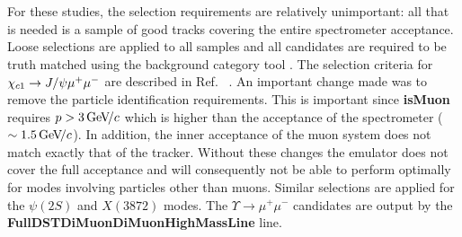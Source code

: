 For these studies, the selection requirements are relatively
unimportant: all that is needed is a sample of good tracks covering
the entire spectrometer acceptance.  Loose selections are applied to all samples and all candidates are
required to be truth matched using the background category tool
\cite{Gligorov:1035682}. The selection criteria for ${\chi_{{c} 1}} \rightarrow
J/\psi \mu^+ \mu^-$ are described in
Ref. ~\cite{Anderlini:2270922}. An important change made was to remove the
particle identification requirements.  This is important since
\textbf{isMuon} requires $p > 3 \text{\,Ge\kern -0.1em V\!/}c$ which is higher than the
acceptance of the spectrometer ($\sim 1.5 \text{\,Ge\kern -0.1em V\!/}c$). In addition, the inner
acceptance of the muon system does not match exactly that of the
tracker. Without these changes the emulator does not cover the full
acceptance and will consequently not be able to perform optimally for
modes involving particles other than muons.  Similar selections are applied for the $\psi(2S)$ and
$X(3872)$ modes. The $\Upsilon \rightarrow \mu^+ \mu^-$ candidates are
output by the \textbf{FullDSTDiMuonDiMuonHighMassLine} line.